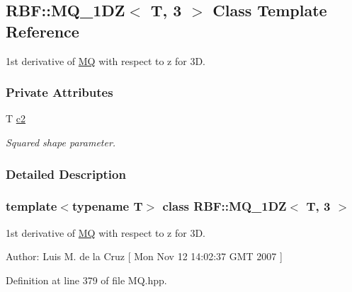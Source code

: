 \hypertarget{classRBF_1_1MQ__1DZ_3_01T_00_013_01_4}{
\subsection{RBF::MQ\_\-1DZ$<$ T, 3 $>$ Class Template Reference}
\label{classRBF_1_1MQ__1DZ_3_01T_00_013_01_4}
}
1st derivative of \hyperlink{classRBF_1_1MQ}{MQ} with respect to z for 3D.  


\subsubsection*{Private Attributes}
\begin{CompactItemize}
\item 
\hypertarget{classRBF_1_1MQ__1DZ_3_01T_00_013_01_4_0bc4e2b6c0f4f22760523ec91020778a}{
T \hyperlink{classRBF_1_1MQ__1DZ_3_01T_00_013_01_4_0bc4e2b6c0f4f22760523ec91020778a}{c2}}
\label{classRBF_1_1MQ__1DZ_3_01T_00_013_01_4_0bc4e2b6c0f4f22760523ec91020778a}

\begin{CompactList}\small\item\em Squared shape parameter. \item\end{CompactList}\end{CompactItemize}


\subsubsection{Detailed Description}
\subsubsection*{template$<$typename T$>$ class RBF::MQ\_\-1DZ$<$ T, 3 $>$}

1st derivative of \hyperlink{classRBF_1_1MQ}{MQ} with respect to z for 3D. 

\begin{Desc}
\item[Author:]Luis M. de la Cruz \mbox{[} Mon Nov 12 14:02:37 GMT 2007 \mbox{]} \end{Desc}


Definition at line 379 of file MQ.hpp.